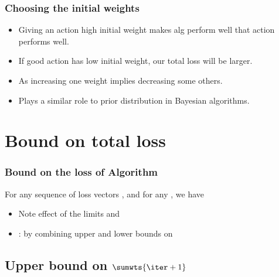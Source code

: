 \documentclass{beamer}
\begin{document}
\begin{frame} 
\frametitle{Choosing the initial weights} 

\begin{itemize}
\item Giving an action high initial weight makes alg perform well
   that action performs well.
\item If good action has low initial weight, our total loss will
  be larger.
\item As  increasing one weight
  implies decreasing some others.
\item Plays a similar role to prior distribution in Bayesian
  algorithms.
\end{itemize}

\end{frame} 

\section{Bound on total loss}
\begin{frame}
\frametitle{Bound on the loss of \ouralg Algorithm}
\begin{theorem} \label{thm:basic-bnd}
For any sequence of loss vectors ,
and for any , we have
\end{theorem}
\begin{itemize}
\item Note effect of the limits  and \R{$\eta \to \infty$}
\item
{}: by combining upper and lower bounds on 
\end{itemize}
\end{frame}

\subsection{Upper bound on $\sumwts{\iter+1}$}
\end{document}
